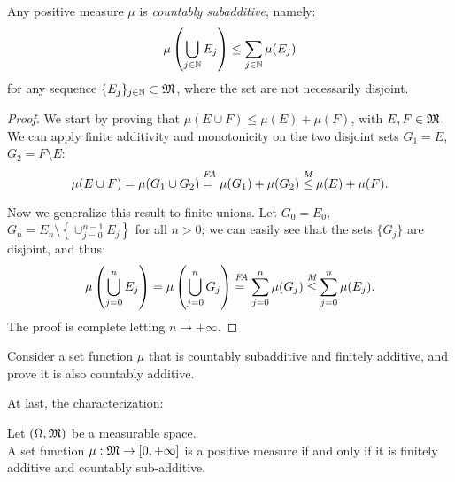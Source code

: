 \begin{prop}
  Any positive measure $\mu$ is \emph{countably subadditive}, namely:
  $$
  	\mu \left( \bigcup_{j \in \mathbb N} E_j \right) 
  	\le \sum_{j \in \mathbb N} \mu(E_j)
  $$
  for any sequence $\{ E_j \}_{j \in \mathbb N} \subset \mathfrak M$, where the set are not necessarily disjoint.
\end{prop}
\begin{proof}
  We start by proving that $\mu(E \cup F) \le \mu(E) + \mu (F)$, with $E, F \in \mathfrak M$.\\
  We can apply finite additivity and monotonicity on the two disjoint sets $G_1 = E$, $G_2 = F \setminus E$:
  $$
  	\mu(E \cup F) 
  	= \mu(G_1 \cup G_2)
  	\overset{\textit{FA}}{=\vphantom{\le}} \mu(G_1) + \mu(G_2)
  	\overset{\textit{M}}{\le} \mu(E) + \mu(F)
  .
  $$

  Now we generalize this result to finite unions. Let $G_0 = E_0$, $G_n = E_n \setminus \left\{ \cup_{j=0}^{n-1} E_j \right\}$ for all $n>0$; we can easily see that the sets $\{G_j\}$ are disjoint, and thus:
  $$
  	\mu \left( \bigcup_{j = 0}^n E_j \right)
  	= \mu \left( \bigcup_{j = 0}^n G_j \right)
  	\overset{\textit{FA}}{= \vphantom{\le}} \sum_{j = 0}^n \mu(G_j)
  	\overset{\textit{M}}{\le} \sum_{j = 0}^n \mu(E_j)
  .
  $$
  The proof is complete letting $n \to +\infty$.
\end{proof}

\begin{exer}
	Consider a set function $\mu$ that is countably subadditive and finitely additive, and prove it is also countably additive.
\end{exer}

At last, the characterization:
\begin{prop}
	Let $(\Omega, \mathfrak M)$ be a measurable space.\\
	A set function $\mu: \mathfrak M \to [0,+\infty]$ is a positive measure if and only if it is finitely additive and countably sub-additive.
\end{prop}

